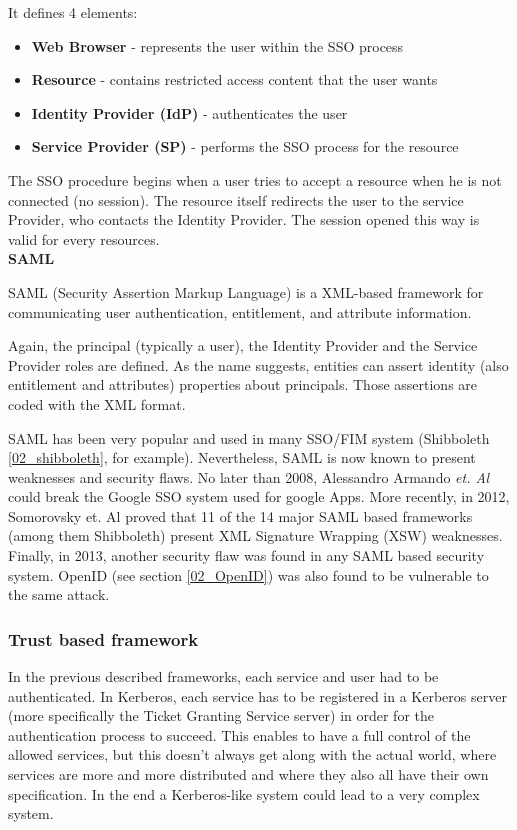 It defines 4 elements:
\begin{itemize}
	\item \textbf{Web Browser} - represents the user within the SSO process
	\item \textbf{Resource} - contains restricted access content that the user wants
	\item \textbf{Identity Provider (IdP)} - authenticates the user
	\item \textbf{Service Provider (SP)} - performs the SSO process for the resource
\end{itemize} 

The SSO procedure begins when a user tries to accept a resource when he is not connected (no session). The resource itself redirects the user to the service Provider, who contacts the Identity Provider. The session opened this way is valid for every resources.
\\

\quad \tabitem \textbf{SAML}
\label{02_SAML}

SAML (Security Assertion Markup Language)\cite{hughes2005security} is a XML-based framework for communicating user authentication, entitlement, and attribute information.

Again, the principal (typically a user), the Identity Provider and the Service Provider roles are defined. As the name suggests, entities can assert identity (also entitlement and attributes) properties about principals. Those assertions are coded with the XML format.

SAML has been very popular and used in many SSO/FIM system (Shibboleth \ref{02_shibboleth}, for example). Nevertheless, SAML is now known to present weaknesses and security flaws. No later than 2008, Alessandro Armando \textit{et. Al} could break the Google SSO system used for google Apps\cite{Armando2008}. More recently, in 2012, Somorovsky et. Al proved that 11 of the 14 major SAML based frameworks (among them Shibboleth) present XML Signature Wrapping (XSW) weaknesses\cite{somorovsky2012breaking}. Finally, in 2013, another security flaw was found in any SAML based security system\cite{armando2013authentication}. OpenID (see section \ref{02_OpenID}) was also found to be vulnerable to the same attack.




\subsubsection{Trust based framework}
In the previous described frameworks, each service and user had to be authenticated. In Kerberos, each service has to be registered in a Kerberos server (more specifically the Ticket Granting Service server) in order for the authentication process to succeed. This enables to have a full control of the allowed services, but this doesn't always get along with the actual world, where services are more and more distributed and where they also all have their own specification. In the end a Kerberos-like system could lead to a very complex system. 

